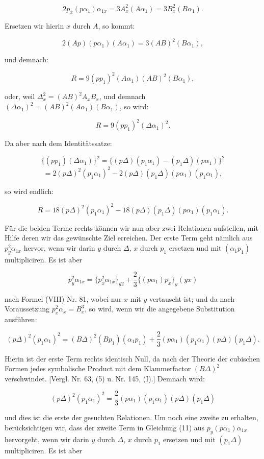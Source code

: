 \documentclass[11pt]{article}
\providecommand{\weq}[2]{\begin{equation}\tag{#1}#2\end{equation}}
\let\Delta\varDelta
\begin{document}
\weq{10}{2p_x(p\alpha_1)\alpha_{1x}=3A_x^2(A\alpha_1)=3B_x^2(B\alpha_1).}

Ersetzen wir hierin $x$ durch $A$, so kommt:

\[
2(Ap)(p\alpha_1)(A\alpha_1)=3(AB)^2(B\alpha_1),
\]

und demnach:

\[
R=9(pp_1)^2(A\alpha_1)(AB)^2(B\alpha_1),
\]

oder, weil $\Delta_x^2=(AB)^2A_xB_x$, und demnach $(\Delta\alpha_1)^2=(AB)^2(A\alpha_1)(B\alpha_1)$, so wird:

\[
R=9(pp_1)^2(\Delta\alpha_1)^2.
\]

Da aber nach dem Identitätssatze:

\[
\{(pp_1)(\Delta\alpha_1)\}^2=\{(p\Delta)(p_1\alpha_1)-(p_1\Delta)(p\alpha_1)\}^2
\]
\[
=2(p\Delta)^2(p_1\alpha_1)^2-2(p\Delta)(p_1\Delta)(p\alpha_1)(p_1\alpha_1),
\]

so wird endlich:

\weq{11}{R=18(p\Delta)^2(p_1\alpha_1)^2-18(p\Delta)(p_1\Delta)(p\alpha_1)(p_1\alpha_1).}

Für die beiden Terme rechts können wir nun aber zwei Relationen aufstellen, mit Hilfe deren wir das gewünschte Ziel erreichen. Der erste Term geht nämlich aus $p_y^2\alpha_{1x}$ hervor, wenn wir darin $y$ durch $\Delta$, $x$ durch $p_1$ ersetzen und mit $(\alpha_1p_1)$ multipliciren. Es ist aber

\[
p_y^2\alpha_{1x}=\{p_x^2\alpha_{1x}\}_{y2}+\frac{2}{3}\{(p\alpha_1)p_x\}_y(yx)
\]

nach Formel (VIII) Nr. 81, wobei nur $x$ mit $y$ vertauscht ist; und da nach Voraussetzung $p_x^2\alpha_x=B_x^3$, so wird, wenn wir die angegebene Substitution ausführen:

\[
(p\Delta)^2(p_1\alpha_1)^2=(B\Delta)^2(Bp_1)(\alpha_1p_1)+\frac{2}{3}(p\alpha_1)(p_1\alpha_1)(p\Delta)(p_1\Delta).
\]

Hierin ist der erste Term rechts identisch Null, da nach der Theorie der cubischen Formen jedes symbolische Product mit dem Klammerfactor $(B\Delta)^2$ verschwindet. [Vergl. Nr. 63, (5) u. Nr. 145, (I).] Demnach wird:

\weq{12}{(p\Delta)^2(p_1\alpha_1)^2=\frac{2}{3}(p\alpha_1)(p_1\alpha_1)(p\Delta)(p_1\Delta)}

und dies ist die erste der gesuchten Relationen. Um noch eine zweite zu erhalten, berücksichtigen wir, dass der zweite Term in Gleichung (11) aus $p_y(p\alpha_1)\alpha_{1x}$ hervorgeht, wenn wir darin $y$ durch $\Delta$, $x$ durch $p_1$ ersetzen und mit $(p_1\Delta)$ multipliciren. Es ist aber
\end{document}
